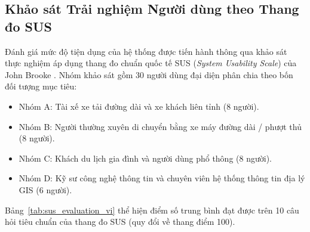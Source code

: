 \subsection{Khảo sát Trải nghiệm Người dùng theo Thang đo SUS}
Đánh giá mức độ tiện dụng của hệ thống được tiến hành thông qua khảo sát thực nghiệm áp dụng thang đo chuẩn quốc tế SUS (\textit{System Usability Scale}) của John Brooke \cite{brooke1996sus}. Nhóm khảo sát gồm 30 người dùng đại diện phân chia theo bốn đối tượng mục tiêu:
\begin{itemize}
    \item[-] Nhóm A: Tài xế xe tải đường dài và xe khách liên tỉnh (8 người).
    \item[-] Nhóm B: Người thường xuyên di chuyển bằng xe máy đường dài / phượt thủ (8 người).
    \item[-] Nhóm C: Khách du lịch gia đình và người dùng phổ thông (8 người).
    \item[-] Nhóm D: Kỹ sư công nghệ thông tin và chuyên viên hệ thống thông tin địa lý GIS (6 người).
\end{itemize}

Bảng~\ref{tab:sus_evaluation_vi} thể hiện điểm số trung bình đạt được trên 10 câu hỏi tiêu chuẩn của thang đo SUS (quy đổi về thang điểm 100).

